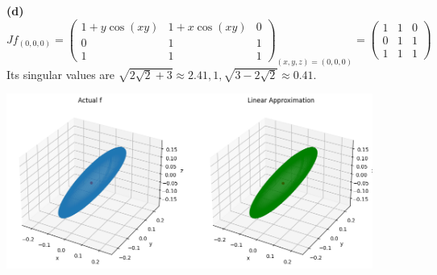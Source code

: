 \documentclass[a4paper, 12pt]{article}
\begin{document}
\begin{solution}
    \textbf{(d)}
    \[
    Jf_{(0, 0, 0)} = \begin{pmatrix}
        1 + y\cos(xy) & 1 + x\cos(xy) & 0\\
        0 & 1 & 1 \\
        1 & 1 & 1
    \end{pmatrix}_{(x, y, z) = (0, 0, 0)} = \begin{pmatrix}
    1 & 1 & 0 \\
    0 & 1 & 1\\
    1 & 1 & 1
    \end{pmatrix}
    \]
    Its singular values are $\sqrt{2\sqrt{2} + 3} \approx 2.41, 1, \sqrt{3 - 2\sqrt{2}} \approx 0.41$.
    \begin{center}
        \includegraphics[width= 12cm]{./figures/6.8d.png}
    \end{center}
\end{solution}
\end{document}
